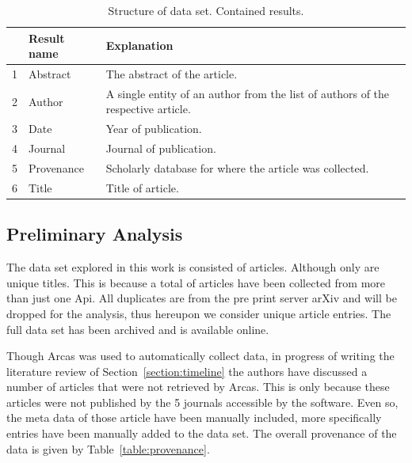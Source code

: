 \documentclass{article}
\newcommand{\totalarticles}{}
\newcommand{\uniquetitles}{}
\newcommand{\numberofduplicates}{}
\newcommand{\manual}{}
\begin{document}
\begin{table}[!hbtp]
    \begin{center}
        \begin{tabular}{lll}
            \toprule
             & Result name & Explanation \\
             \midrule
             1 & Abstract & The abstract of the article.\\ 
             2 & Author & A single entity of an author from the list of 
             authors of the respective article.\\ 
             3 & Date & Year of publication.\\ 
             4 & Journal & Journal of publication.\\               
             5 & Provenance & Scholarly database for where the article was 
             collected.\\                        
             6 & Title & Title of article.\\               
            \bottomrule
        \end{tabular}
    \end{center}
    \caption{Structure of data set. Contained results.}
    \label{table:result_set}
\end{table}

\subsection{Preliminary Analysis}

The data set explored in this work is consisted of \totalarticles articles. Although only
\uniquetitles are unique titles. This is because a total of \numberofduplicates
articles have been collected from more than just one Api. All \numberofduplicates
duplicates are from the pre print server arXiv and will be dropped
for the analysis, thus hereupon we consider \uniquetitles unique article entries. The full
data set has been archived and is available online. %

Though Arcas was used to automatically collect data, in progress of writing the
literature review of Section~\ref{section:timeline} the authors have discussed 
a number of articles that were not retrieved by Arcas. This is only because these
articles were not published by the 5 journals accessible by the software. Even so,
the meta data of those article have been manually included, more specifically
\manual entries have been manually added to the data set. The overall provenance
of the data is given by Table~\ref{table:provenance}.
\end{document}
